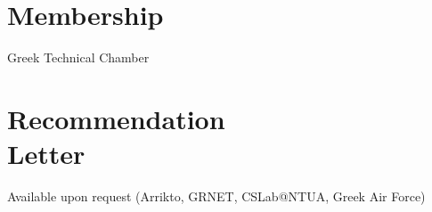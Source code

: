 \documentclass[margin,centered]{res}
\begin{document}
\begin{resume}
\section{\sc Membership}
Greek Technical Chamber

%
\section{\sc Recommendation\\Letter}
Available upon request (Arrikto, GRNET, CSLab@NTUA, Greek Air Force)

\end{resume}

\def\enoteheading{\section{Notes}\rule[0pt]{\textwidth}{0.4pt}}
\parskip=2pt
\theendnotes
\end{document}
